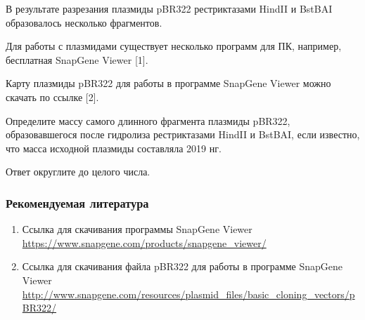 
В результате разрезания плазмиды pBR322 рестриктазами HindII и BstBAI образовалось несколько фрагментов.

Для работы с плазмидами существует несколько программ для ПК, например, бесплатная SnapGene Viewer [1].

Карту плазмиды pBR322 для работы в программе SnapGene Viewer можно скачать по ссылке [2].

Определите массу самого длинного фрагмента плазмиды pBR322, образовавшегося после гидролиза рестриктазами HindII и BstBAI, если известно, что масса исходной плазмиды составляла 2019 нг.

Ответ округлите до целого числа. 


\subsubsection*{Рекомендуемая литература}

\begin{enumerate}
    \item Ссылка для скачивания программы SnapGene Viewer \url{https://www.snapgene.com/products/snapgene_viewer/}
    \item Ссылка для скачивания файла pBR322 для работы в программе SnapGene Viewer \url{http://www.snapgene.com/resources/plasmid_files/basic_cloning_vectors/pBR322/}
\end{enumerate}